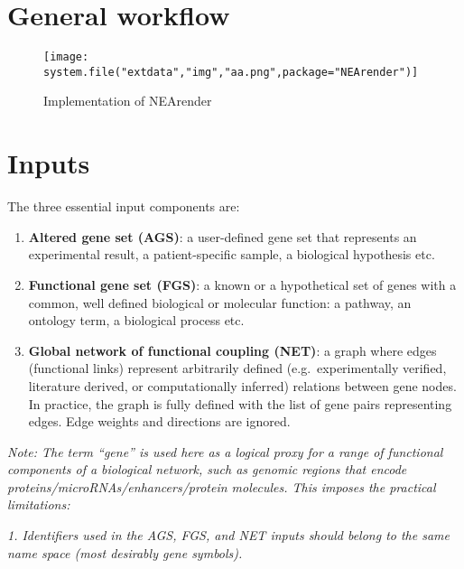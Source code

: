 \documentclass[]{article}
\begin{document}
\pagebreak

\hypertarget{test1}{\section{General workflow}\label{test1}}

\begin{figure}
\centering
\texttt{[image: system.file("extdata","img","aa.png",package="NEArender")]}
\caption{Implementation of NEArender \label{figlab0}}
\end{figure}

\hypertarget{test3}{\section{Inputs}\label{test3}}

The three essential input components are:

\begin{enumerate}
\def\labelenumi{\arabic{enumi}.}
\item
  \textbf{Altered gene set (AGS)}: a user-defined gene set that
  represents an experimental result, a patient-specific sample, a
  biological hypothesis etc.
\item
  \textbf{Functional gene set (FGS)}: a known or a hypothetical set of
  genes with a common, well defined biological or molecular function: a
  pathway, an ontology term, a biological process etc.
\item
  \textbf{Global network of functional coupling (NET)}: a graph where
  edges (functional links) represent arbitrarily defined
  (e.g.~experimentally verified, literature derived, or computationally
  inferred) relations between gene nodes. In practice, the graph is
  fully defined with the list of gene pairs representing edges. Edge
  weights and directions are ignored.
\end{enumerate}

\emph{Note: The term ``gene'' is used here as a logical proxy for a
range of functional components of a biological network, such as genomic
regions that encode proteins/microRNAs/enhancers/protein molecules. This
imposes the practical limitations:}

\emph{1. Identifiers used in the AGS, FGS, and NET inputs should belong
to the same name space (most desirably gene symbols).}
\end{document}
